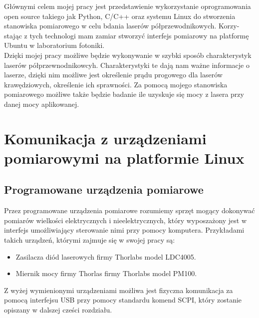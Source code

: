 \documentclass[a4paper, portrait,12pt]{report}
\begin{document}
Głównymi celem mojej pracy jest przedstawienie wykorzystanie oprogramowania
open source takiego jak Python, C/C++ oraz systemu Linux do stworzenia stanowiska pomiarowego w celu bdania laserów półprzewodnikowych. Korzy-
stając z tych technologi mam zamiar stworzyć interfejs pomiarowy na platformę Ubuntu
w laboratorium fotoniki. \\

Dzięki mojej pracy możliwe będzie wykonywanie w szybki sposób charakterystyk laserów półprzewnodnikowcyh. Charakterystyki te dają nam ważne informacje o laserze, dzięki nim możliwe jest określenie prądu progowego dla laserów krawędziowych, określenie ich sprawności. Za pomocą mojego stanowiska pomiarowego możliwe także będzie badanie ile uzyskuje się mocy z lasera przy danej mocy aplikowanej.



\chapter{Komunikacja z urządzeniami pomiarowymi na platformie Linux}
\section{Programowane urządzenia pomiarowe}
Przez  programowane urządzenia pomiarowe rozumiemy sprzęt mogący dokonywać pomiarów wielkości elektrycznych i nieelektrycznych, który wyposzażony jest w interfejs umożliwiający sterowanie nimi przy pomocy komputera. Przykładami takich urządzeń, którymi zajmuje się w swojej pracy są:
\begin{itemize}
\item Zasilacza diód laserowych firmy Thorlabs model LDC4005.
\item Miernik mocy firmy Thorlas firmy Thorlabs model PM100.
\end{itemize}
Z wyżej wymienionymi urządzeniami możliwa jest fizyczna komunikacja za pomocą interfejsu USB przy pomocy standardu komend SCPI, który zostanie opiszany w dalszej cześci rozdziału.
\end{document}
